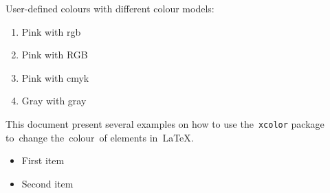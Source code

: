 \documentclass[a4paper,11pt]{article}
\begin{document}
User-defined colours with different colour models:

\begin{enumerate}
\item \textcolor{mypink1}{Pink with rgb}

\item \textcolor{mypink2}{Pink with RGB}

\item \textcolor{mypink3}{Pink with cmyk}

\item \textcolor{mygray}{Gray with gray}
\end{enumerate}




This document present several examples on how to use
the~\texttt{xcolor} package to~change the~colour~of elements
in~\LaTeX.

\begin{itemize}
\item \textcolor{Mycolor1}{First item}

\item \textcolor{Mycolor2}{Second item}
\end{itemize}


\noindent {\color{LightRubineRed} \rule{\linewidth}{1mm} }

\noindent {\color{RubineRed} \rule{\linewidth}{1mm} }
\end{document}
